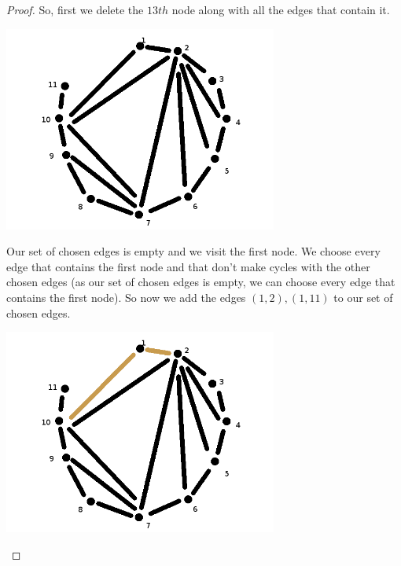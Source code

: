 \begin{proof}
    So, first we delete the $13th$ node along with all the edges that contain it. 
    \begin{center}
        \includegraphics[width=9cm]{Homework1/Problem4/TriangulationToPlanarRootedTree2.png}
    \end{center}
    
    Our set of chosen edges is empty and we visit the first node. We choose every edge that contains the first node and that don't make cycles with
    the other chosen edges (as our set of chosen edges is empty, we can choose every edge that contains the first node). So now we add the edges 
    $(1, 2), (1, 11)$ to our set of chosen edges.
    \begin{center}
        \includegraphics[width=9cm]{Homework1/Problem4/TriangulationToPlanarRootedTree3.png}
    \end{center}
    

\end{proof}
